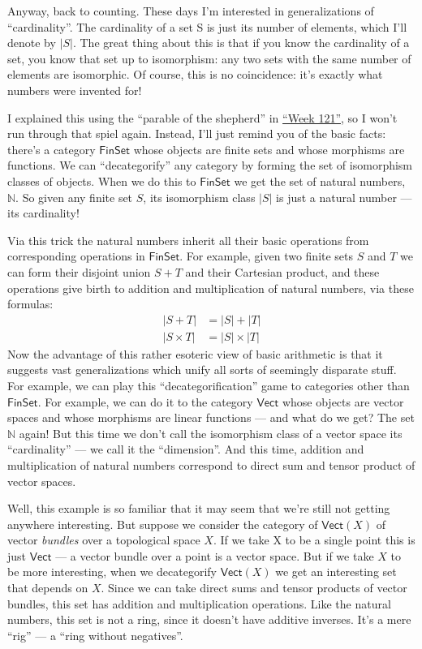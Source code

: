 \documentclass{article}
\begin{document}
Anyway, back to counting. These days I'm interested in generalizations
of ``cardinality''. The cardinality of a set S is just its number of
elements, which I'll denote by \(|S|\). The great thing about this is
that if you know the cardinality of a set, you know that set up to
isomorphism: any two sets with the same number of elements are
isomorphic. Of course, this is no coincidence: it's exactly what numbers
were invented for!

I explained this using the ``parable of the shepherd'' in
\protect\hyperlink{week121}{``Week 121''}, so I won't run through that
spiel again. Instead, I'll just remind you of the basic facts: there's a
category \(\mathsf{FinSet}\) whose objects are finite sets and whose
morphisms are functions. We can ``decategorify'' any category by forming
the set of isomorphism classes of objects. When we do this to
\(\mathsf{FinSet}\) we get the set of natural numbers, \(\mathbb{N}\).
So given any finite set \(S\), its isomorphism class \(|S|\) is just a
natural number --- its cardinality!

Via this trick the natural numbers inherit all their basic operations
from corresponding operations in \(\mathsf{FinSet}\). For example, given
two finite sets \(S\) and \(T\) we can form their disjoint union
\(S + T\) and their Cartesian product, and these operations give birth
to addition and multiplication of natural numbers, via these formulas:
\[
  \begin{aligned}
    |S + T| &= |S| + |T|
  \\|S \times T| &= |S| \times |T|
  \end{aligned}
\] Now the advantage of this rather esoteric view of basic arithmetic is
that it suggests vast generalizations which unify all sorts of seemingly
disparate stuff. For example, we can play this ``decategorification''
game to categories other than \(\mathsf{FinSet}\). For example, we can
do it to the category \(\mathsf{Vect}\) whose objects are vector spaces
and whose morphisms are linear functions --- and what do we get? The set
\(\mathbb{N}\) again! But this time we don't call the isomorphism class
of a vector space its ``cardinality'' --- we call it the ``dimension''.
And this time, addition and multiplication of natural numbers correspond
to direct sum and tensor product of vector spaces.

Well, this example is so familiar that it may seem that we're still not
getting anywhere interesting. But suppose we consider the category of
\(\mathsf{Vect}(X)\) of vector \emph{bundles} over a topological space
\(X\). If we take X to be a single point this is just \(\mathsf{Vect}\)
--- a vector bundle over a point is a vector space. But if we take \(X\)
to be more interesting, when we decategorify \(\mathsf{Vect}(X)\) we get
an interesting set that depends on \(X\). Since we can take direct sums
and tensor products of vector bundles, this set has addition and
multiplication operations. Like the natural numbers, this set is not a
ring, since it doesn't have additive inverses. It's a mere ``rig'' --- a
``ring without negatives''.
\end{document}
